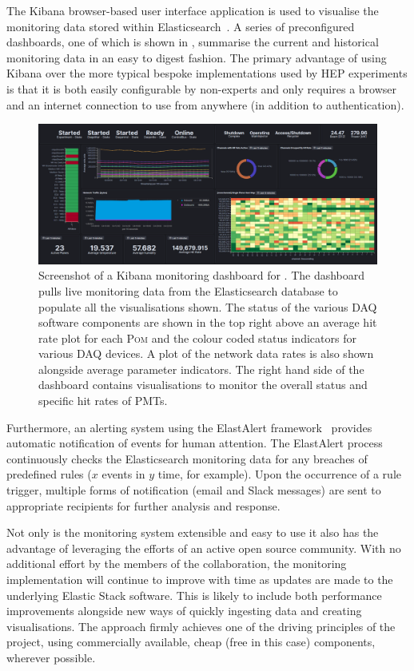 The Kibana browser-based user interface application is used to visualise the monitoring data
stored within Elasticsearch~\cite{kibana2020}. A series of preconfigured dashboards, one of which
is shown in , summarise the current and historical monitoring data in an
easy to digest fashion. The primary advantage of using Kibana over the more typical bespoke
implementations used by HEP experiments is that it is both easily configurable by non-experts and
only requires a browser and an internet connection to use from anywhere (in addition to
authentication).

\begin{figure} %
    \includegraphics[width=\textwidth]{diagrams/5-daq/monitoring.pdf}
    \caption[Screenshot of a Kibana monitoring dashboard for \chipsfive]
    {Screenshot of a Kibana monitoring dashboard for \chipsfive. The dashboard pulls live
    monitoring data from the Elasticsearch database to populate all the visualisations shown. The
    status of the various DAQ software components are shown in the top right above an average hit
    rate plot for each \textsc{Pom} and the colour coded status indicators for various DAQ
    devices. A plot of the network data rates is also shown alongside average parameter
    indicators. The right hand side of the dashboard contains visualisations to monitor the
    overall status and specific hit rates of PMTs.}
    \label{fig:monitoring}
\end{figure}

Furthermore, an alerting system using the ElastAlert framework~\cite{elastalert2020} provides
automatic notification of events for human attention. The ElastAlert process continuously checks
the Elasticsearch monitoring data for any breaches of predefined rules ($x$ events in $y$ time,
for example). Upon the occurrence of a rule trigger, multiple forms of notification (email and
Slack messages) are sent to appropriate recipients for further analysis and response.

Not only is the \chipsfive monitoring system extensible and easy to use it also has the advantage
of leveraging the efforts of an active open source community. With no additional effort by the
members of the \chips collaboration, the monitoring implementation will continue to improve with
time as updates are made to the underlying Elastic Stack software. This is likely to include both
performance improvements alongside new ways of quickly ingesting data and creating visualisations.
The approach firmly achieves one of the driving principles of the \chips project, using
commercially available, cheap (free in this case) components, wherever possible.